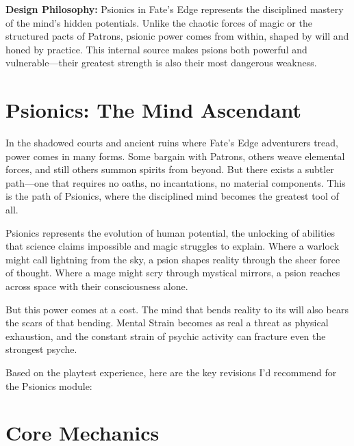 \documentclass[11pt,twoside]{article}
\begin{document}



\thispagestyle{fancy}

\begin{center}
\begin{minipage}{0.9\textwidth}
\begin{framed}
\noindent \textbf{Design Philosophy:} Psionics in Fate's Edge represents the disciplined mastery of the mind's hidden potentials. Unlike the chaotic forces of magic or the structured pacts of Patrons, psionic power comes from within, shaped by will and honed by practice. This internal source makes psions both powerful and vulnerable---their greatest strength is also their most dangerous weakness.
\end{framed}
\end{minipage}
\end{center}

\section*{Psionics: The Mind Ascendant}

In the shadowed courts and ancient ruins where Fate's Edge adventurers tread, power comes in many forms. Some bargain with Patrons, others weave elemental forces, and still others summon spirits from beyond. But there exists a subtler path---one that requires no oaths, no incantations, no material components. This is the path of Psionics, where the disciplined mind becomes the greatest tool of all.

Psionics represents the evolution of human potential, the unlocking of abilities that science claims impossible and magic struggles to explain. Where a warlock might call lightning from the sky, a psion shapes reality through the sheer force of thought. Where a mage might scry through mystical mirrors, a psion reaches across space with their consciousness alone.

But this power comes at a cost. The mind that bends reality to its will also bears the scars of that bending. Mental Strain becomes as real a threat as physical exhaustion, and the constant strain of psychic activity can fracture even the strongest psyche.

Based on the playtest experience, here are the key revisions I'd recommend for the Psionics module:


\section{Core Mechanics}
\end{document}
